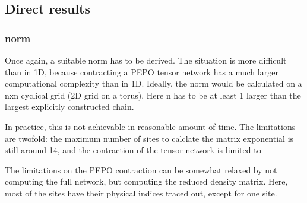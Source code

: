 \subsection{Direct results}

\subsubsection{norm}

Once again, a suitable norm has to be derived. The situation is more difficult than in 1D, because contracting a PEPO tensor network has a much larger computational complexity than in 1D. Ideally, the norm would be calculated on a nxn cyclical grid (2D grid on a torus). Here n has to be at least 1 larger than the largest explicitly constructed chain.

In practice, this is not achievable in reasonable amount of time. The limitations are twofold: the maximum number of sites to calclate the matrix exponential is still around 14, and the contraction of the tensor network is limited to 

The limitations on the PEPO contraction can be somewhat relaxed by not computing the full network, but computing the reduced density matrix. Here, most of the sites have their physical indices traced out, except for one site.

